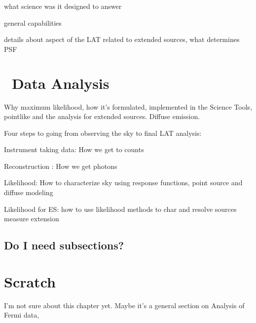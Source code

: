  what science was it designed to answer
 
 general capabilities
 
 details about aspect of the LAT related to extended sources, what determines PSF
 \section{\label{FGST:analysis}\gam~Data Analysis}
 
 Why maximum likelihood, how it's formulated,  implemented in the Science Tools, pointlike and the analysis for extended sources. Diffuse emission.
 
 
 Four steps to going from observing the sky to final LAT analysis:
 
 Instrument taking data: How we get to counts
 
 Reconstruction : How we get photons
 
 Likelihood: How to characterize sky using response functions, point source  and diffuse modeling
 
 Likelihood for ES: how to use likelihood methods to char and resolve sources measure  extension
\subsection{\label{FGST:sub}Do I need subsections?}
\section{Scratch}




I'm not sure about this chapter yet. Maybe it's a general section on Analysis of Fermi data,


